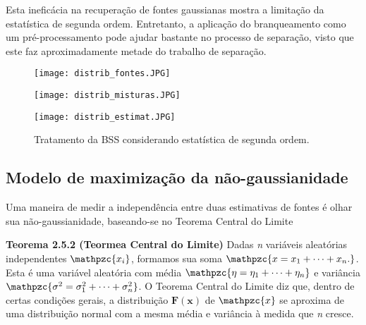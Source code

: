     Esta ineficácia na recuperação de fontes gaussianas mostra a limitação da estatística de segunda ordem. Entretanto, a aplicação do branqueamento como um pré-processamento pode ajudar bastante no processo de separação, visto que este faz aproximadamente metade do trabalho de separação.
    
  \begin{figure}
    \begin{subfigure}
    \begin{center}
        \texttt{[image: distrib\_fontes.JPG]}
        \caption{Distribuição conjunta das fontes.}
         \label{fig:orthogonalproblema}
    \end{center}
     \end{subfigure}
     \begin{subfigure}
     \begin{center}
        \texttt{[image: distrib\_misturas.JPG]}
         \caption{Distribuição conjunta das misturas.}
        \label{fig:orthogonalproblemb}
    \end{center}
     \end{subfigure}
     \begin{subfigure}
     \begin{center}
        \texttt{[image: distrib\_estimat.JPG]}
         \caption{Distribuição conjunta das estimativas obtidas a partir do braqueamento das misturas.}
                 \label{fig:orthogonalproblemc}
     \end{center}
     \end{subfigure}
     
  \caption{Tratamento da BSS considerando estatística de segunda ordem.}
  \label{fig:orthogonalproblem2}
\end{figure}

\subsection{Modelo de maximização da não-gaussianidade}
    
    Uma maneira de medir a independência entre duas estimativas de fontes é olhar sua não-gaussianidade, baseando-se no Teorema Central do Limite \cite{central}
    
    \medskip
    
    \textbf{Teorema 2.5.2 (Teormea Central do Limite)} Dadas \textit{n} variáveis aleatórias independentes $\mathpzc{x_i}$, formamos sua soma $\mathpzc{x = x_1 + \dots + x_n.}$. Esta é uma variável aleatória com média $\mathpzc{\eta = \eta_1 + \dots + \eta_n}$ e variância $\mathpzc{\sigma^2 = \sigma_1^2 + \dots + \sigma_n^2}$. O Teorema Central do Limite diz que, dentro de certas condições gerais, a distribuição $\mathbf{F(x)}$ de $\mathpzc{x}$  se aproxima de uma distribuição normal com a mesma média e variância à medida que \textit{n} cresce.
    
